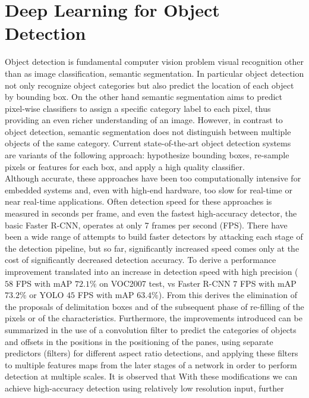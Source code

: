 \section{Deep Learning for Object Detection}
\label{sec:nn-objectdetection}
Object detection is fundamental computer vision problem visual recognition other
than as image classification, semantic segmentation. In particular object
detection not only recognize object categories but also predict the location of
each object by  bounding box. On the other hand semantic segmentation aims to
predict pixel-wise classifiers to assign a specific category label to each
pixel, thus providing an even richer understanding of an image. However, in
contrast to object detection, semantic segmentation does not distinguish between
multiple objects of the same category.\cite{wu2020recent}
Current state-of-the-art object detection systems are variants of the following
approach: hypothesize bounding boxes, re-sample pixels or features for each box,
and apply a high quality classifier.\\  
Although accurate, these approaches have
been too computationally intensive for embedded systems and, even with high-end
hardware, too slow for real-time or near real-time applications. Often detection
speed for these approaches is measured in seconds per frame, and even the
fastest high-accuracy detector, the basic Faster R-CNN, operates at only 7
frames per second (FPS). There have been a wide range of attempts to build
faster detectors by attacking each stage of the detection pipeline, but so far,
significantly increased speed comes only at the cost of significantly decreased
detection accuracy.\cite{liu2016ssd}
To derive a performance improvement translated into an increase in detection
speed with high precision ($58$ FPS with mAP $72.1\%$ on VOC2007 test, vs Faster
R-CNN $7$ FPS with mAP $73.2\%$ or YOLO $45$ FPS with mAP $63.4\%$). From this
derives the elimination of the proposals of delimitation boxes and of the
subsequent phase of re-filling of the pixels or of the characteristics.
Furthermore, the improvements introduced can be summarized in the use of a
convolution filter to predict the categories of objects and offsets in the
positions in the positioning of the panes, using separate predictors (filters)
for different aspect ratio detections, and applying these filters to multiple
features maps from the later stages of a network in order to perform detection
at multiple scales. \hfill \break
It is observed that With these modifications we can achieve
high-accuracy detection using relatively low resolution input, further
